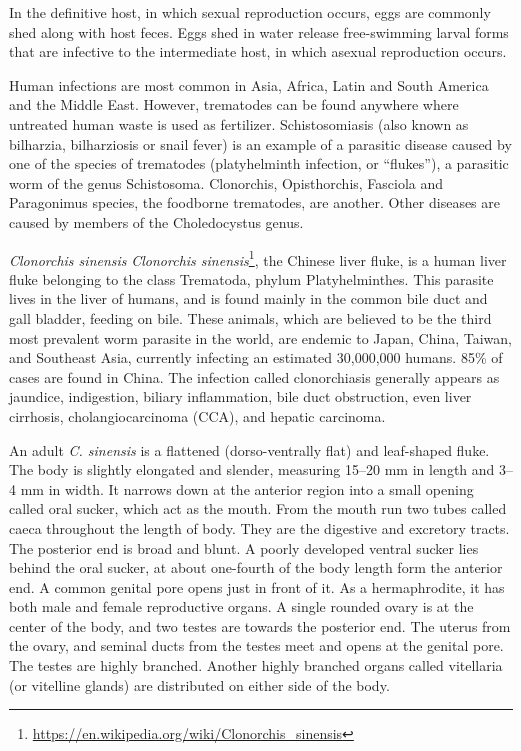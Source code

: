 \documentclass[]{book}
\let\rmarkdownfootnote\footnote%
\def\footnote{\protect\rmarkdownfootnote}
\renewcommand{\href}[2]{#2\footnote{\url{#1}}}
\theoremstyle{definition}
\theoremstyle{definition}
\theoremstyle{definition}
\theoremstyle{remark}
\begin{document}
In the definitive host, in which sexual reproduction occurs, eggs are
commonly shed along with host feces. Eggs shed in water release
free-swimming larval forms that are infective to the intermediate host,
in which asexual reproduction occurs.

Human infections are most common in Asia, Africa, Latin and South
America and the Middle East. However, trematodes can be found anywhere
where untreated human waste is used as fertilizer. Schistosomiasis (also
known as bilharzia, bilharziosis or snail fever) is an example of a
parasitic disease caused by one of the species of trematodes
(platyhelminth infection, or ``flukes''), a parasitic worm of the genus
Schistosoma. Clonorchis, Opisthorchis, Fasciola and Paragonimus species,
the foodborne trematodes, are another. Other diseases are caused by
members of the Choledocystus genus.

\emph{Clonorchis sinensis}
\href{https://en.wikipedia.org/wiki/Clonorchis_sinensis}{\emph{Clonorchis
sinensis}}, the Chinese liver fluke, is a human liver fluke belonging to
the class Trematoda, phylum Platyhelminthes. This parasite lives in the
liver of humans, and is found mainly in the common bile duct and gall
bladder, feeding on bile. These animals, which are believed to be the
third most prevalent worm parasite in the world, are endemic to Japan,
China, Taiwan, and Southeast Asia, currently infecting an estimated
30,000,000 humans. 85\% of cases are found in China. The infection
called clonorchiasis generally appears as jaundice, indigestion, biliary
inflammation, bile duct obstruction, even liver cirrhosis,
cholangiocarcinoma (CCA), and hepatic carcinoma.

An adult \emph{C. sinensis} is a flattened (dorso-ventrally flat) and
leaf-shaped fluke. The body is slightly elongated and slender, measuring
15--20 mm in length and 3--4 mm in width. It narrows down at the
anterior region into a small opening called oral sucker, which act as
the mouth. From the mouth run two tubes called caeca throughout the
length of body. They are the digestive and excretory tracts. The
posterior end is broad and blunt. A poorly developed ventral sucker lies
behind the oral sucker, at about one-fourth of the body length form the
anterior end. A common genital pore opens just in front of it. As a
hermaphrodite, it has both male and female reproductive organs. A single
rounded ovary is at the center of the body, and two testes are towards
the posterior end. The uterus from the ovary, and seminal ducts from the
testes meet and opens at the genital pore. The testes are highly
branched. Another highly branched organs called vitellaria (or vitelline
glands) are distributed on either side of the body.
\end{document}
